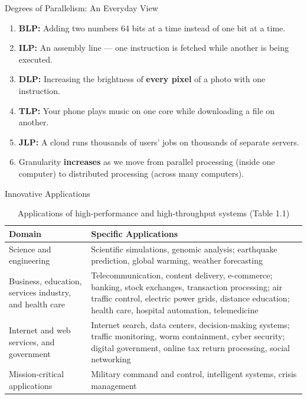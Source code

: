\begin{frame}{Degrees of Parallelism: An Everyday View}
\begin{enumerate}
\item<1-> \textbf{BLP:} Adding two numbers 64 bits at a time instead of one bit at a time.
\item<2-> \textbf{ILP:} An assembly line --- one instruction is fetched while another is being executed.
\item<3-> \textbf{DLP:} Increasing the brightness of \textbf{every pixel} of a photo with one instruction.
\item<4-> \textbf{TLP:} Your phone plays music on one core while downloading a file on another.
\item<5-> \textbf{JLP:} A cloud runs thousands of users' jobs on thousands of separate servers.
\item<6-> Granularity \textbf{increases} as we move from parallel processing (inside one computer) to distributed processing (across many computers).
\end{enumerate}
\end{frame}

\begin{frame}{Innovative Applications}
\begin{table}
\centering
\renewcommand{\arraystretch}{1.25}
\scriptsize
\begin{tabular}{|p{3.6cm}|p{9.6cm}|}
\hline
\textbf{Domain} & \textbf{Specific Applications} \\ \hline
Science and engineering & Scientific simulations, genomic analysis; earthquake prediction, global warming, weather forecasting \\ \hline
Business, education, services industry, and health care & Telecommunication, content delivery, e-commerce; banking, stock exchanges, transaction processing; air traffic control, electric power grids, distance education; health care, hospital automation, telemedicine \\ \hline
Internet and web services, and government & Internet search, data centers, decision-making systems; traffic monitoring, worm containment, cyber security; digital government, online tax return processing, social networking \\ \hline
Mission-critical applications & Military command and control, intelligent systems, crisis management \\ \hline
\end{tabular}
\caption{\scriptsize Applications of high-performance and high-throughput systems (Table 1.1)}
\end{table}
\end{frame}

